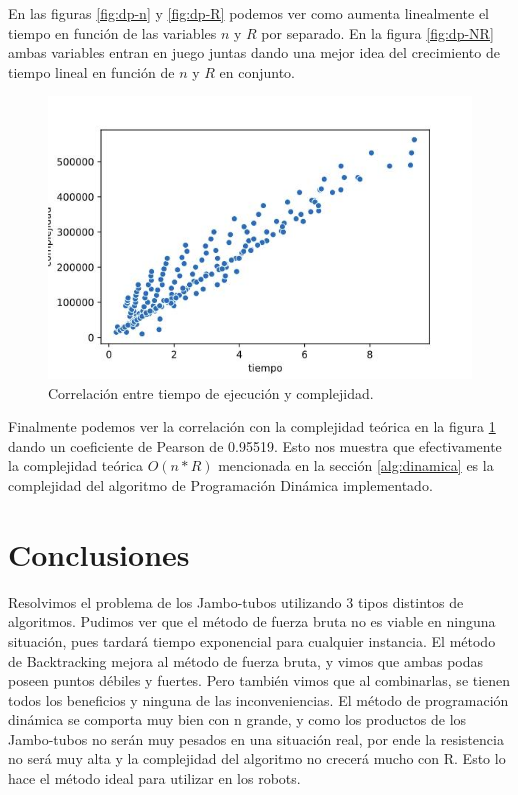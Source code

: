\documentclass[10pt,a4paper]{article}
\begin{document}
En las figuras \ref{fig:dp-n} y \ref{fig:dp-R} podemos ver como aumenta linealmente el tiempo en función de las variables $n$ y $R$ por separado. En la figura \ref{fig:dp-NR} ambas variables entran en juego juntas dando una mejor idea del crecimiento de tiempo lineal en función de $n$ y $R$ en conjunto.
\newline
\begin{figure}[h!]
	\centering
	\includegraphics[scale=0.35]{img/dp-correlacion.jpg}
	\caption{Correlación entre tiempo de ejecución y complejidad.}
	\label{fig:dp-complejidad}
\end{figure}
\newline
Finalmente podemos ver la correlación con la complejidad teórica en la figura \ref{fig:dp-complejidad} dando un coeficiente de Pearson\cite{ref:pearson} de 0.95519. Esto nos muestra que efectivamente la complejidad teórica $O(n*R)$ mencionada en la sección \ref{alg:dinamica} es la complejidad del algoritmo de Programación Dinámica implementado.
\newpage

\section{Conclusiones} \label{sec:conclusiones}
Resolvimos el problema de los Jambo-tubos utilizando 3 tipos distintos de algoritmos.
Pudimos ver que el método de fuerza bruta no es viable en ninguna situación, pues tardará tiempo exponencial para cualquier instancia.
El método de Backtracking mejora al método de fuerza bruta, y vimos que ambas podas poseen puntos débiles y fuertes. Pero también vimos que al combinarlas, se tienen todos los beneficios y ninguna de las inconveniencias.
El método de programación dinámica se comporta muy bien con n grande, y como los productos de los Jambo-tubos no serán muy pesados en una situación real, por ende la resistencia no será muy alta y la complejidad del algoritmo no crecerá mucho con R. Esto lo hace el método ideal para utilizar en los robots.

\newpage
\nocite{*}
\end{document}
